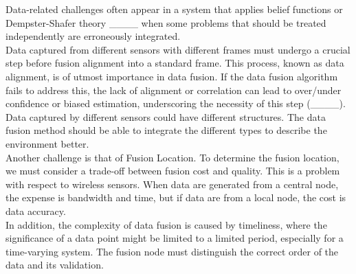 Data-related challenges often appear in a system that applies belief functions or Dempster-Shafer theory ____ when some problems that should be treated independently are erroneously integrated.\\

 Data captured from different sensors with different frames must undergo a crucial step before fusion alignment into a standard frame. This process, known as data alignment, is of utmost importance in data fusion. If the data fusion algorithm fails to address this, the lack of alignment or correlation can lead to over/under confidence or biased estimation, underscoring the necessity of this step (____).\\
 
Data captured by different sensors could have different structures. The data fusion method should be able to integrate the different types to describe the environment better.\\

Another challenge is that of Fusion Location. To determine the fusion location, we must consider a trade-off between fusion cost and quality. This is a problem with respect to wireless sensors. When data are generated from a central node, the expense is bandwidth and time, but if data are from a local node, the cost is data accuracy.\\

In addition, the complexity of data fusion is caused by timeliness, where the significance of a data point might be limited to a limited period, especially for a time-varying system. The fusion node must distinguish the correct order of the data and its validation. 


